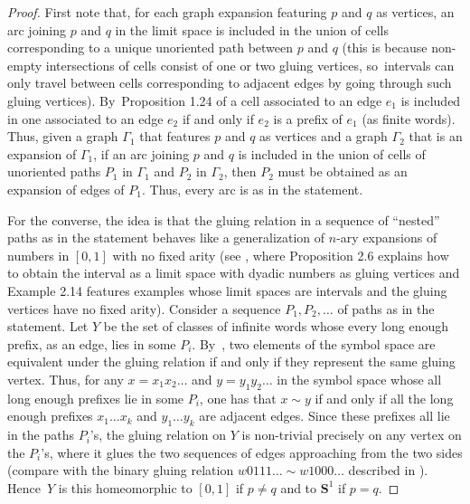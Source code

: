 \documentclass[JEP,XML,SOM,Unicode,NoFloatCountersInSection,published]{cedram}
\theoremstyle{plain}
\theoremstyle{definition}
\theoremstyle{remark}
\begin{document}
\begin{proof}
First note that, for each graph expansion featuring $p$ and $q$ as vertices, an arc joining $p$ and $q$ in the limit space is included in the union of cells corresponding to a unique unoriented path between $p$ and $q$ (this is because non-empty intersections of cells consist of one or two gluing vertices, so~intervals can only travel between cells corresponding to adjacent edges by going through such gluing vertices). By~Proposition 1.24 of \cite{Belk-Forrest} a cell associated to an edge $e_1$ is included in one associated to an edge $e_2$ if and only if $e_2$ is a prefix of $e_1$ (as finite words).
Thus, given a graph $\Gamma_1$ that features $p$ and $q$ as vertices and a graph $\Gamma_2$ that is an expansion of $\Gamma_1$, if an arc joining $p$ and $q$ is included in the union of cells of unoriented paths $P_1$ in $\Gamma_1$ and $P_2$ in $\Gamma_2$, then $P_2$ must be obtained as an expansion of edges of $P_1$.
Thus, every arc is as in the statement.

For the converse, the idea is that the gluing relation in a sequence of ``nested'' paths as in the statement behaves like a generalization of $n$-ary expansions of numbers in $[0,1]$ with no fixed arity (see \cite{Belk-Forrest}, where Proposition 2.6 explains how to obtain the interval as a limit space with dyadic numbers as gluing vertices and Example 2.14 features examples whose limit spaces are intervals and the gluing vertices have no fixed arity).
Consider a sequence $P_1, P_2, \dots$ of paths as in the statement.
Let $Y$ be the set of classes of infinite words whose every long enough prefix, as an edge, lies in some $P_i$. By~\cite[Prop.\,1.22]{Belk-Forrest}, two elements of the symbol space are equivalent under the gluing relation if and only if they represent the same gluing vertex.
Thus, for any $x = x_1 x_2 \dots$ and $y = y_1 y_2 \dots$ in the symbol space whose all long enough prefixes lie in some $P_i$, one has that $x \sim y$ if and only if all the long enough prefixes $x_1 \dots x_k$ and $y_1 \dots y_k$ are adjacent edges.
Since these prefixes all lie in the paths $P_i$'s, the gluing relation on $Y$ is non-trivial precisely on any vertex on the $P_i$'s, where it glues the two sequences of edges approaching from the two sides (compare with the binary gluing relation $w0111\ldots \sim w1000\ldots$ described in \cite[Prop.\,2.6]{Belk-Forrest}).
Hence~$Y$ is this homeomorphic to $[0,1]$ if $p \neq q$ and to $\mathbf{S}^1$ if $p=q$.
\end{proof}
\end{document}
